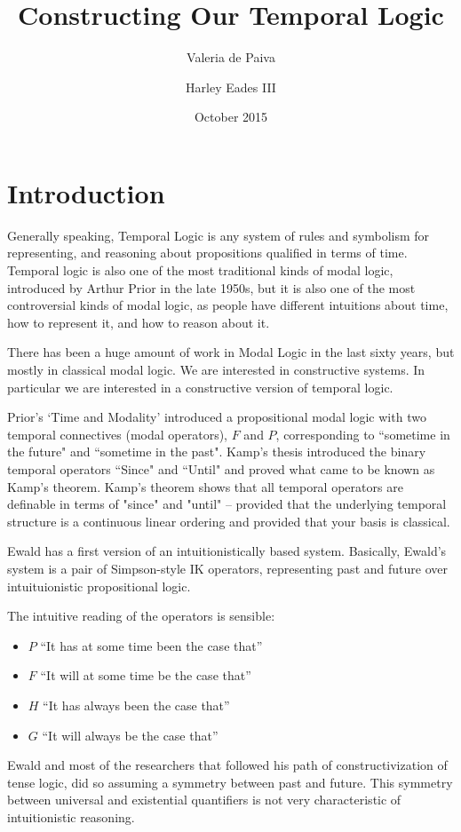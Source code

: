 \documentclass{article}
\title{Constructing Our Temporal Logic}
\author{Valeria de Paiva \and Harley Eades III}
\date{October 2015}
\begin{document}
\maketitle

\section{Introduction}
Generally  speaking, Temporal Logic is any system of rules and symbolism for representing, and reasoning about propositions qualified in terms of time. 
Temporal logic is also one of the most traditional kinds of modal logic, introduced by Arthur Prior in the late 1950s,
but it is also one of the most controversial kinds of modal logic, as people have different intuitions about time, how to represent it, and how to reason about it. 

There has been a huge amount of work in Modal Logic in the last sixty years, but mostly in classical modal logic. We are interested in constructive systems. In particular we are interested in a constructive version of temporal logic.

Prior's  `Time and Modality'  introduced a propositional modal logic with two temporal connectives (modal operators), $F$ and $P$, corresponding to ``sometime in the future" and ``sometime in the past". Kamp's thesis  introduced the binary temporal operators ``Since" and ``Until" and proved what came to be known as Kamp's theorem. Kamp's theorem  shows that all temporal operators are definable in terms of "since" and "until" -- provided that the underlying temporal structure is a continuous linear ordering and provided that your basis is classical.

Ewald \cite{ewald1986} has a first version of an intuitionistically based system. Basically, Ewald's system is a pair of Simpson-style IK operators\cite{simpson1994}, representing past and future over intuituionistic propositional logic.

The intuitive reading of the operators is sensible:
\begin{itemize}
\item $P$ “It has at some time been the case that” 
\item $F$ “It will at some time be the case that” 
\item $H$ “It has always been the case that” 
\item $G$  “It will always be the case that” 
\end{itemize}
Ewald and most of the researchers that followed his path of constructivization of tense logic, did so assuming a symmetry between past and future. This  symmetry between universal and existential quantifiers is not very characteristic of intuitionistic reasoning.
\end{document}
